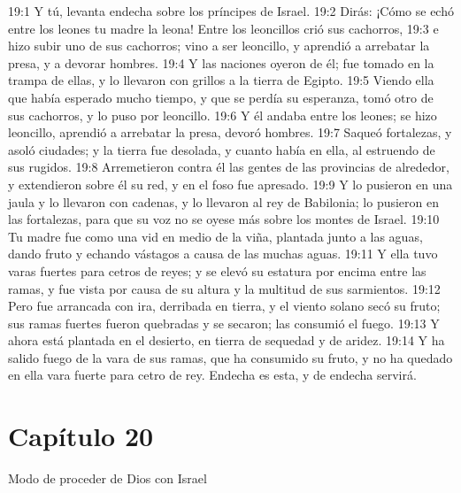 19:1 Y tú, levanta endecha sobre los príncipes de Israel.   
19:2 Dirás: ¡Cómo se echó entre los leones tu madre la leona! Entre los leoncillos crió sus cachorros,   
19:3 e hizo subir uno de sus cachorros; vino a ser leoncillo, y aprendió a arrebatar la presa, y a devorar hombres.   
19:4 Y las naciones oyeron de él; fue tomado en la trampa de ellas, y lo llevaron con grillos a la tierra de Egipto.   
19:5 Viendo ella que había esperado mucho tiempo, y que se perdía su esperanza, tomó otro de sus cachorros, y lo puso por leoncillo.   
19:6 Y él andaba entre los leones; se hizo leoncillo, aprendió a arrebatar la presa, devoró hombres.   
19:7 Saqueó fortalezas, y asoló ciudades; y la tierra fue desolada, y cuanto había en ella, al estruendo de sus rugidos.   
19:8 Arremetieron contra él las gentes de las provincias de alrededor, y extendieron sobre él su red, y en el foso fue apresado.   
19:9 Y lo pusieron en una jaula y lo llevaron con cadenas, y lo llevaron al rey de Babilonia; lo pusieron en las fortalezas, para que su voz no se oyese más sobre los montes de Israel.   
19:10 Tu madre fue como una vid en medio de la viña, plantada junto a las aguas, dando fruto y echando vástagos a causa de las muchas aguas.   
19:11 Y ella tuvo varas fuertes para cetros de reyes; y se elevó su estatura por encima entre las ramas, y fue vista por causa de su altura y la multitud de sus sarmientos.   
19:12 Pero fue arrancada con ira, derribada en tierra, y el viento solano secó su fruto; sus ramas fuertes fueron quebradas y se secaron; las consumió el fuego.   
19:13 Y ahora está plantada en el desierto, en tierra de sequedad y de aridez.   
19:14 Y ha salido fuego de la vara de sus ramas, que ha consumido su fruto, y no ha quedado en ella vara fuerte para cetro de rey. Endecha es esta, y de endecha servirá.   
\section*{Capítulo 20 } 
Modo de proceder de Dios con Israel   
  
